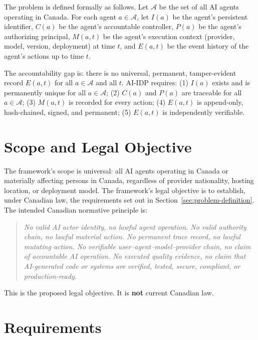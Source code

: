 \documentclass[11pt,a4paper]{article}
\begin{document}
The problem is defined formally as follows. Let $\mathcal{A}$ be the set of all AI agents operating in Canada. For each agent $a \in \mathcal{A}$, let $I(a)$ be the agent's persistent identifier, $C(a)$ be the agent's accountable controller, $P(a)$ be the agent's authorizing principal, $M(a, t)$ be the agent's execution context (provider, model, version, deployment) at time $t$, and $E(a, t)$ be the event history of the agent's actions up to time $t$.

The accountability gap is: there is no universal, permanent, tamper-evident record $E(a, t)$ for all $a \in \mathcal{A}$ and all $t$. AI-IDP requires: (1) $I(a)$ exists and is permanently unique for all $a \in \mathcal{A}$; (2) $C(a)$ and $P(a)$ are traceable for all $a \in \mathcal{A}$; (3) $M(a, t)$ is recorded for every action; (4) $E(a, t)$ is append-only, hash-chained, signed, and permanent; (5) $E(a, t)$ is independently verifiable.

\section{Scope and Legal Objective}
\label{sec:scope}

The framework's scope is universal: all AI agents operating in Canada or materially affecting persons in Canada, regardless of provider nationality, hosting location, or deployment model. The framework's legal objective is to establish, under Canadian law, the requirements set out in Section~\ref{sec:problem-definition}. The intended Canadian normative principle is:

\begin{quote}
\textit{No valid AI actor identity, no lawful agent operation. No valid authority chain, no lawful material action. No permanent trace record, no lawful mutating action. No verifiable user--agent--model--provider chain, no claim of accountable AI operation. No executed quality evidence, no claim that AI-generated code or systems are verified, tested, secure, compliant, or production-ready.}
\end{quote}

This is the proposed legal objective. It is \textbf{not} current Canadian law.

\section{Requirements}
\label{sec:requirements}
\end{document}
